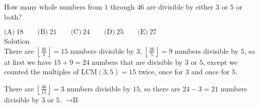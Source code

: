 

How many whole numbers from $1$ through $46$ are divisible by either $3$ or $5$ or both?

$\text{(A)}\ 18 \qquad \text{(B)}\ 21 \qquad \text{(C)}\ 24 \qquad \text{(D)}\ 25 \qquad \text{(E)}\ 27$
\\
Solution
\\
There are $\left\lfloor \frac{46}{3}\right\rfloor =15$ numbers divisible by $3$, $\left\lfloor\frac{46}{5}\right\rfloor =9$ numbers divisible by $5$, so at first we have $15+9=24$ numbers that are divisible by $3$ or $5$, except we counted the multiples of $\text{LCM}(3,5)=15$ twice, once for $3$ and once for $5$.

There are $\left\lfloor \frac{46}{15}\right\rfloor =3$ numbers divisible by $15$, so there are $24-3=21$ numbers divisible by $3$ or $5$. $\rightarrow \boxed{\text{B}}$

